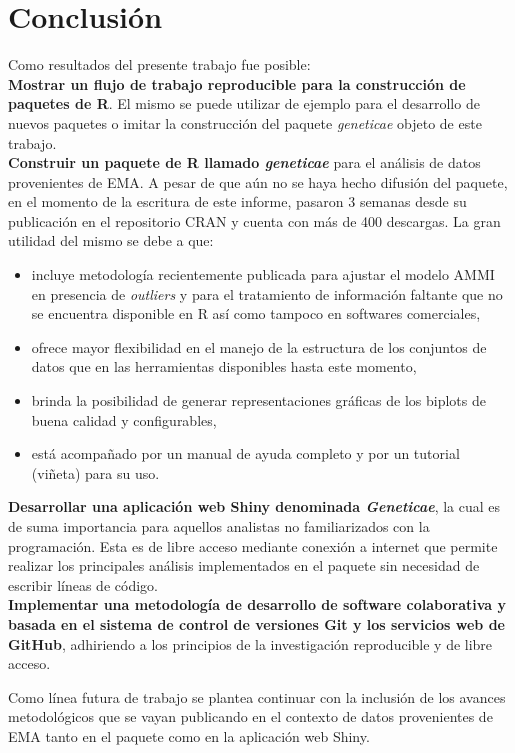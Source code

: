 \chapter{Conclusión}

Como resultados del presente trabajo fue posible:\\

\textbf{Mostrar un flujo de trabajo reproducible para la construcción de paquetes de R}. El mismo se puede utilizar de ejemplo para el desarrollo de nuevos paquetes o imitar la construcción del paquete \emph{geneticae} objeto de este trabajo. \\

\textbf{Construir un paquete de R llamado \emph{geneticae}} para el análisis de datos provenientes de EMA. A pesar de que aún no se haya hecho difusión del paquete, en el momento de la escritura de este informe, pasaron 3 semanas desde su publicación en el repositorio CRAN y cuenta con más de 400 descargas. La gran utilidad del mismo se debe a que:

\begin{itemize}
\item incluye metodología recientemente publicada para ajustar el modelo AMMI en presencia de \emph{outliers} y para el tratamiento de información faltante que no se encuentra disponible en R así como tampoco en softwares comerciales,

\item ofrece mayor flexibilidad en el manejo de la estructura de los conjuntos de datos que en las herramientas disponibles hasta este momento,

\item brinda la posibilidad de generar representaciones gráficas de los biplots de buena calidad y configurables,

\item está acompañado por un manual de ayuda completo y por un tutorial (viñeta) para su uso.
\end{itemize}


\textbf{Desarrollar una aplicación web Shiny denominada \emph{Geneticae}}, la cual es de suma importancia para aquellos analistas no familiarizados con la programación. Esta es de libre acceso mediante conexión a internet que permite realizar los principales análisis implementados en el paquete sin necesidad de escribir líneas de código. \\

\textbf{Implementar una metodología de desarrollo de software colaborativa y basada en el sistema de control de versiones Git y los servicios web de GitHub}, adhiriendo a los principios de la investigación reproducible y de libre acceso.

Como línea futura de trabajo se plantea continuar con la inclusión de los avances metodológicos que se vayan publicando en el contexto de datos provenientes de EMA tanto en el paquete como en la aplicación web Shiny. 




